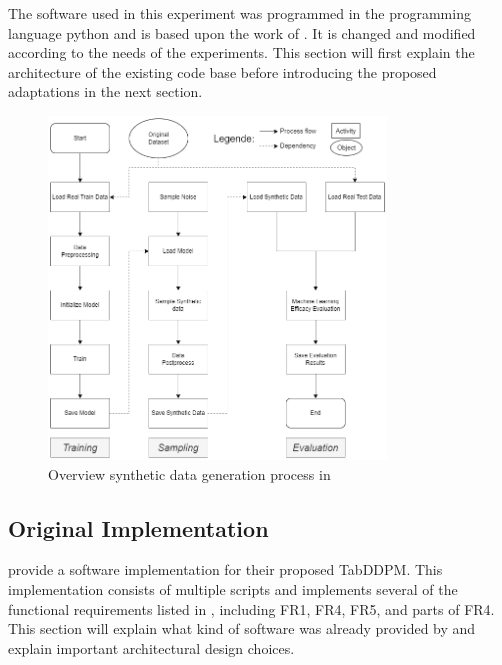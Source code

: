 The software \cite{akim2023TabDDPMModellingTabular} used in this experiment was programmed in the programming language python \cite{van1995python} and is based upon the work of \cite{kotelnikov2022TabDDPMModellingTabular}.
It is changed and modified according to the needs of the experiments.
This section will first explain the architecture of the existing code base before introducing the proposed adaptations in the next section.

\begin{figure}[h]
	\centering
	\includegraphics[width=0.8\textwidth]{images/Overall_original.png}
	\caption[Overview Original Software]{Overview synthetic data generation process in \cite{akim2023TabDDPMModellingTabular}}
	\label{fig:overall_original}
\end{figure}


\subsection{Original Implementation}
\label{ch:conceptualDesign-existingCodeBase-originalImplementation}

\textcite{akim2023TabDDPMModellingTabular} provide a software implementation for their proposed TabDDPM.
This implementation consists of multiple scripts and implements several of the functional requirements listed in , including FR1, FR4, FR5, and parts of FR4.
This section will explain what kind of software was already provided by \cite{kotelnikov2022TabDDPMModellingTabular} and explain important architectural design choices.


